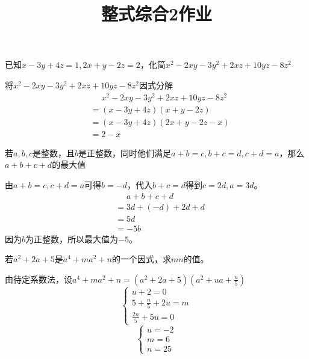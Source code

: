 \documentclass[windows,csize4,answers]{BHCexam}
\title{整式综合2作业}
\begin{document}
\maketitle


\begin{groups}
    \begin{questions}[]

        \question[5] 已知$x-3y+4z=1,2x+y-2z=2$，化简$x^2-2xy-3y^2+2xz+10yz-8z^2$
        \begin{solution}{0.5cm}
            \methodonly 将$x^2-2xy-3y^2+2xz+10yz-8z^2$因式分解
            \[
                \begin{aligned}
                    &\phantom{=} x^2-2xy-3y^2+2xz+10yz-8z^2 \\ 
                    &=(x-3y+4z)(x+y-2z) \\ 
                    &=(x-3y+4z)(2x+y-2z-x) \\ 
                    &=2-x
                \end{aligned}
            \]
        \end{solution}
        \vspace{3.5cm}

        \question[5] 若$a,b,c$是整数，且$b$是正整数，同时他们满足$a+b=c,b+c=d,c+d=a$，那么$a+b+c+d$的最大值
        \begin{solution}{0.5cm}
            \methodonly 由$a+b=c, c+d=a$可得$b=-d$，代入$b+c=d$得到$c=2d, a=3d$。
            \[
                \begin{aligned}
                    &\phantom{=} a+b+c+d \\ 
                    &=3d+(-d)+2d+d \\ 
                    &=5d \\ 
                    &=-5b
                \end{aligned}
            \]
            因为$b$为正整数，所以最大值为$-5$。
        \end{solution}
        \vspace{3.5cm}

        \question[5] 若$a^2+2a+5$是$a^4+ma^2+n$的一个因式，求$mn$的值。
        \begin{solution}{0.5cm}
            \methodonly 由待定系数法，设$a^4+ma^2+n=(a^2+2a+5)(a^2+ua+\frac{n}{5})$
            \[
                \begin{cases}
                    u+2=0 \\
                    5+\frac{n}{5}+2u=m \\ 
                    \frac{2n}{5} +5u=0
                \end{cases}
            \]
            \[
                \begin{cases}
                    u=-2 \\
                    m=6 \\ 
                    n=25
                \end{cases}
            \]
        \end{solution}
        \vspace{3.5cm}


\end{questions}
\end{groups}
\end{document}
